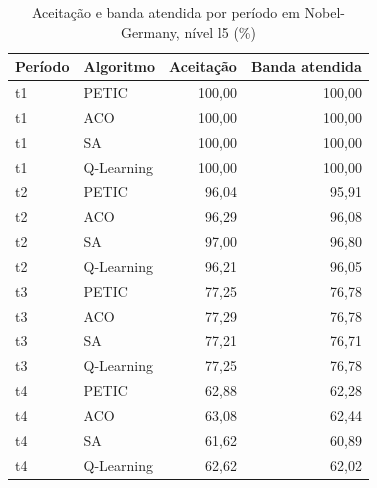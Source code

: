 \begin{table}[htb]
    \centering
    \scriptsize
    \caption{Aceitação e banda atendida por período em Nobel-Germany, nível l5 (\%)}
    \label{tab:periodos-nobel-germany-l5}
    \begin{tabular}{llrr}
        \hline
        Período & Algoritmo & Aceitação & Banda atendida \\
        \hline
        t1 & PETIC & 100,00 & 100,00 \\
        t1 & ACO & 100,00 & 100,00 \\
        t1 & SA & 100,00 & 100,00 \\
        t1 & Q-Learning & 100,00 & 100,00 \\
        t2 & PETIC & 96,04 & 95,91 \\
        t2 & ACO & 96,29 & 96,08 \\
        t2 & SA & 97,00 & 96,80 \\
        t2 & Q-Learning & 96,21 & 96,05 \\
        t3 & PETIC & 77,25 & 76,78 \\
        t3 & ACO & 77,29 & 76,78 \\
        t3 & SA & 77,21 & 76,71 \\
        t3 & Q-Learning & 77,25 & 76,78 \\
        t4 & PETIC & 62,88 & 62,28 \\
        t4 & ACO & 63,08 & 62,44 \\
        t4 & SA & 61,62 & 60,89 \\
        t4 & Q-Learning & 62,62 & 62,02 \\
        \hline
    \end{tabular}
\end{table}

